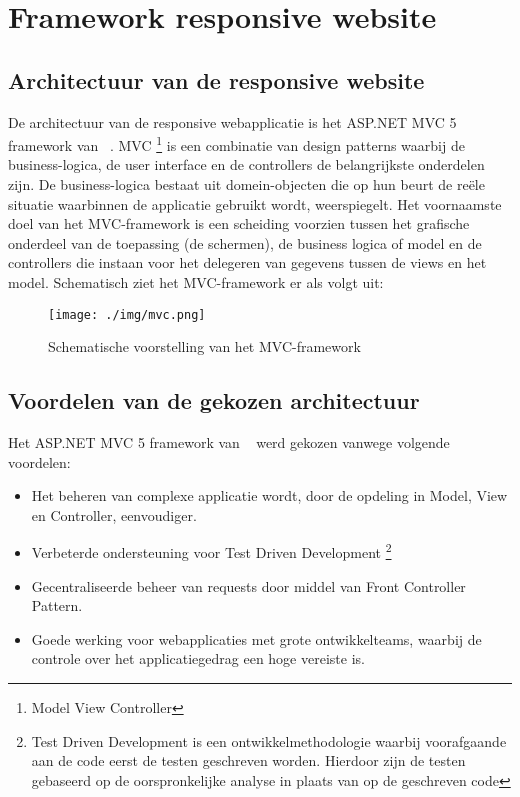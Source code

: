 \chapter{Framework responsive website}
\label{ch:frameworkresponsivewebsite}
\section{Architectuur van de responsive website}
De architectuur van de responsive webapplicatie is het ASP.NET MVC 5 framework van ~\cite{aspnetmvcoverview}.
MVC \footnote{Model View Controller} is een combinatie van design patterns waarbij de business-logica, de user interface en de controllers de belangrijkste
onderdelen zijn. De business-logica bestaat uit domein-objecten die op hun beurt de reële situatie waarbinnen de applicatie
gebruikt wordt, weerspiegelt. Het voornaamste doel van het MVC-framework is een scheiding voorzien tussen het grafische
onderdeel van de toepassing (de schermen), de business logica of model en de controllers die instaan voor het delegeren van gegevens
tussen de views en het model. Schematisch ziet het MVC-framework er als volgt uit:
\begin{figure}[ht!]
\centering
\caption{Schematische voorstelling van het MVC-framework \cite{crossplatformmobiledevelopmentinvisualstudio}}
\texttt{[image: ./img/mvc.png]}
\end{figure}
\section{Voordelen van de gekozen architectuur}
Het ASP.NET MVC 5 framework van ~\cite{aspnetmvcoverview} werd gekozen vanwege volgende voordelen:
\begin{itemize}
  \item Het beheren van complexe applicatie wordt, door de opdeling in Model, View en Controller, eenvoudiger.
  \item Verbeterde ondersteuning voor Test Driven Development \footnote{Test Driven Development is een ontwikkelmethodologie waarbij voorafgaande aan de code eerst de testen geschreven worden. Hierdoor zijn de testen gebaseerd op de oorspronkelijke analyse in plaats van op de geschreven code}
  \item Gecentraliseerde beheer van requests door middel van Front Controller Pattern.
  \item Goede werking voor webapplicaties met grote ontwikkelteams, waarbij de controle over het applicatiegedrag een hoge vereiste is.
\end{itemize}


